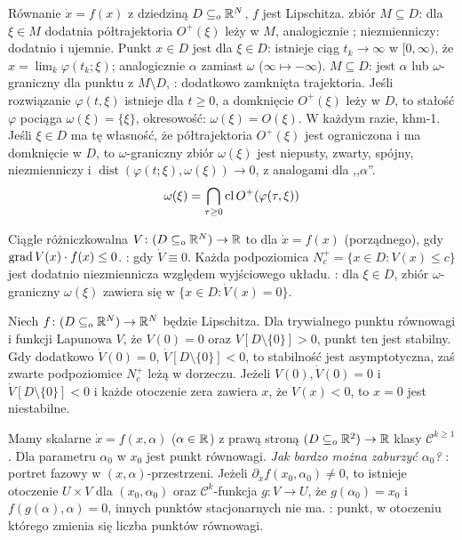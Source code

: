 Równanie $\dot x = f(x)$  z dziedziną $D \subseteq_o \mathbb{R}^N$, $f$ jest Lipschitza.
 zbiór $M \subseteq D$: dla $\xi \in M$ dodatnia półtrajektoria $O^+(\xi)$ leży w $M$, analogicznie ; niezmienniczy: dodatnio i ujemnie.
Punkt $x \in D$ jest  dla $\xi \in D$: istnieje ciąg $t_k \to \infty$ w $[0, \infty)$, że $x = \lim_k \varphi(t_k; \xi)$; analogicznie $\alpha$ zamiast $\omega$ ($\infty \mapsto -\infty$).
 $M \subseteq D$: jest $\alpha$ lub $\omega$-graniczny dla punktu z $M \setminus D$, : dodatkowo zamknięta trajektoria.
Jeśli rozwiązanie $\varphi(t, \xi)$ istnieje dla $t \ge 0$, a domknięcie $O^+(\xi)$ leży w $D$, to stałość $\varphi$ pociąga $\omega(\xi) = \{\xi\}$, okresowość: $\omega(\xi) = O(\xi)$.
W każdym razie, khm-1.
Jeśli $\xi \in D$ ma tę własność, że półtrajektoria $O^+(\xi)$ jest ograniczona i ma domknięcie w $D$, to $\omega$-graniczny zbiór $\omega(\xi)$ jest niepusty, zwarty, spójny, niezmienniczy i $\operatorname{dist}(\varphi(t; \xi), \omega(\xi)) \to 0$, z analogami dla ,,$\alpha$''.
\[
	\omega(\xi) = \bigcap_{\tau \ge 0} \operatorname{cl} O^+(\varphi(\tau, \xi))
\]

Ciągle  różniczkowalna $V \colon (D \subseteq_o \mathbb{R}^N) \to \mathbb{R}$ to  dla $\dot x = f(x)$ (porządnego), gdy $\operatorname{grad} V(x) \cdot f(x) \le 0$.
: gdy $\dot V \equiv 0$.
Każda podpoziomica $N_c^+ = \{x \in D : V(x) \le c\}$ jest dodatnio niezmiennicza względem wyjściowego układu.
: dla $\xi \in D$, zbiór $\omega$-graniczny $\omega(\xi)$ zawiera się w $\{x \in D : \dot V(x) = 0\}$.

Niech  $f \colon (D \subseteq_o \mathbb{R}^N) \to \mathbb{R}^N$ będzie Lipschitza.
Dla trywialnego punktu równowagi i funkcji Lapunowa $V$, że $V(0) = 0$ oraz $V[D \setminus \{0\}] > 0$, punkt ten jest stabilny.
Gdy dodatkowo $\dot V (0)=0$, $\dot V[D \setminus \{0\}] < 0$, to stabilność jest asymptotyczna, zaś zwarte podpoziomice $N_c^+$ leżą w dorzeczu.
Jeżeli $V(0), \dot V(0) = 0$ i $\dot V[D \setminus \{0\}] < 0$ i każde otoczenie zera zawiera $x$, że $V(x) < 0$, to $x = 0$ jest niestabilne.

Mamy  skalarne $\dot x = f(x, \alpha)$ ($\alpha \in \mathbb{R}$) z prawą stroną $(D \subseteq_o \mathbb{R}^2) \to \mathbb{R}$ klasy $\mathscr C^{k \ge 1}$.
Dla parametru $\alpha_0$ w $x_0$ jest punkt równowagi.
\emph{Jak bardzo można zaburzyć $\alpha_0$?}
: portret fazowy w $(x, \alpha)$-przestrzeni.
Jeżeli $\partial_x f(x_0, \alpha_0) \neq 0$, to istnieje otoczenie $U \times V$ dla $(x_0, \alpha_0)$
 oraz $\mathscr C^k$-funkcja $g \colon V \to U$, że $g (\alpha_0) = x_0$ i $f(g(\alpha), \alpha) = 0$, innych punktów stacjonarnych nie ma.
: punkt, w otoczeniu którego zmienia się liczba punktów równowagi.

